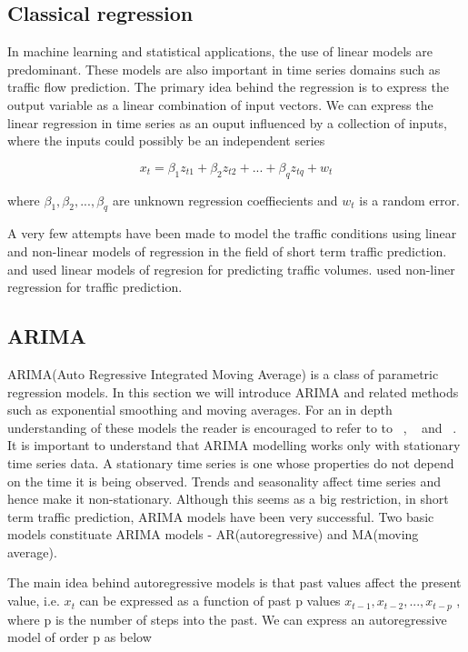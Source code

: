 \subsection{Classical regression}
In machine learning and statistical applications, the use of linear models are predominant. These
models are also important in time series domains such as traffic flow prediction. The primary
idea behind the regression is to express the output variable as a linear combination of input
vectors. We can express the linear regression in time series as an ouput influenced by a
collection of inputs, where the inputs could possibly be an independent series

        \begin{equation}
            x_{t} = \beta_{1}z_{t1} + \beta_{2}z_{t2} + ... + \beta_{q}z_{tq} + w_{t}
        \end{equation}

where $ \beta_{1}, \beta_{2},...,\beta_{q} $ are unknown regression coeffiecients and $w_{t}$ is
a random error.

A very few attempts have been made to model the traffic conditions using linear and non-linear
models of regression in the field of short term traffic prediction. \citet{low1972new} and
\citet{jensen1973calibrating} used linear models of regresion for predicting traffic volumes.
\citet{hogberg1976estimation} used non-liner regression for traffic prediction.

\subsection{ARIMA}
ARIMA(Auto Regressive Integrated Moving Average) is a class of parametric regression models. In
this section we will introduce ARIMA and related methods such as exponential smoothing and moving
averages. For an in depth understanding of these models the reader is encouraged to refer to to
~\citet{tong1990non}, ~\citet{brockwell2006introduction} and ~\citet{box2015time}. It is
important to understand that ARIMA modelling works only with stationary time series data. A
stationary time series is one whose properties do not depend on the time it is being observed.
Trends and seasonality affect time series and hence make it non-stationary. Although this seems as a
big restriction, in short term traffic prediction, ARIMA models have been very successful. Two
basic models constituate ARIMA models - AR(autoregressive) and MA(moving average).

The main idea behind autoregressive models is that past values affect the present value, i.e.
$x_{t}$ can be expressed as a function of past p values $ x_{t-1}, x_{t-2},...,x_{t-p} $ , where
p is the number of steps into the past. We can express an autoregressive model of order p as below


